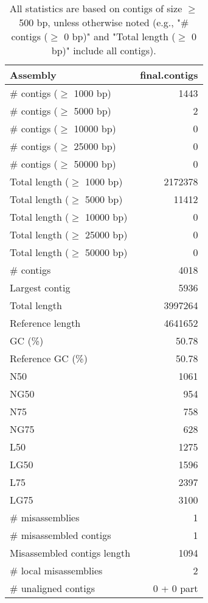 \documentclass[12pt,a4paper]{article}
\begin{document}
\begin{table}[ht]
\begin{center}
\caption{All statistics are based on contigs of size $\geq$ 500 bp, unless otherwise noted (e.g., "\# contigs ($\geq$ 0 bp)" and "Total length ($\geq$ 0 bp)" include all contigs).}
\begin{tabular}{|l*{1}{|r}|}
\hline
Assembly & final.contigs \\ \hline
\# contigs ($\geq$ 1000 bp) & 1443 \\ \hline
\# contigs ($\geq$ 5000 bp) & 2 \\ \hline
\# contigs ($\geq$ 10000 bp) & 0 \\ \hline
\# contigs ($\geq$ 25000 bp) & 0 \\ \hline
\# contigs ($\geq$ 50000 bp) & 0 \\ \hline
Total length ($\geq$ 1000 bp) & 2172378 \\ \hline
Total length ($\geq$ 5000 bp) & 11412 \\ \hline
Total length ($\geq$ 10000 bp) & 0 \\ \hline
Total length ($\geq$ 25000 bp) & 0 \\ \hline
Total length ($\geq$ 50000 bp) & 0 \\ \hline
\# contigs & 4018 \\ \hline
Largest contig & 5936 \\ \hline
Total length & 3997264 \\ \hline
Reference length & 4641652 \\ \hline
GC (\%) & 50.78 \\ \hline
Reference GC (\%) & 50.78 \\ \hline
N50 & 1061 \\ \hline
NG50 & 954 \\ \hline
N75 & 758 \\ \hline
NG75 & 628 \\ \hline
L50 & 1275 \\ \hline
LG50 & 1596 \\ \hline
L75 & 2397 \\ \hline
LG75 & 3100 \\ \hline
\# misassemblies & 1 \\ \hline
\# misassembled contigs & 1 \\ \hline
Misassembled contigs length & 1094 \\ \hline
\# local misassemblies & 2 \\ \hline
\# unaligned contigs & 0 + 0 part \\ \hline

\end{tabular}
\end{center}
\end{table}
\end{document}
